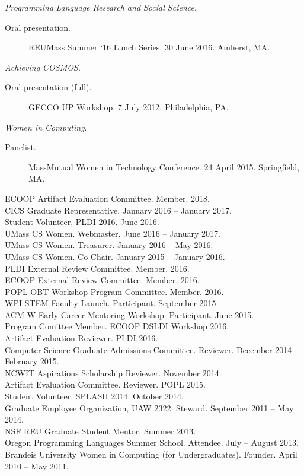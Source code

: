 \documentclass[10pt]{article}
\newcommand{\cvsec}[2]{
    \begin{tcolorbox}[width=\textwidth, breakable, title={#1}]
        #2
    \end{tcolorbox}
    \vspace{10pt}
}
\begin{document}
{    \emph{Programming Language Research and Social Science}.
    \begin{description}
      \item[Oral presentation.] REUMass Summer `16 Lunch Series. 30 June 2016.  Amherst, MA.
    \end{description}
    \vspace{10pt}
    \emph{Achieving COSMOS}.
    \begin{description}
    \item[Oral presentation (full).]  GECCO UP Workshop. 7 July 2012. Philadelphia, PA.
    \end{description}
    \vspace{10pt}
    \emph{Women in Computing}.
    \begin{description}
    \item[Panelist.]  MassMutual Women in Technology Conference. 24 April 2015. Springfield, MA.
    \end{description}
}


\cvsec{Professional Activities and Service}{
  ECOOP Artifact Evaluation Committee. Member. 2018.\\
  CICS Graduate Representative. January 2016 -- January 2017.\\
  Student Volunteer, PLDI 2016. June 2016. \\
  UMass CS Women. Webmaster. June 2016 -- January 2017.\\
  UMass CS Women. Treasurer. January 2016 -- May 2016.\\
  UMass CS Women. Co-Chair. January 2015 -- January 2016.\\
  PLDI External Review Committee.  Member.  2016.\\
  ECOOP External Review Committee.  Member.  2016.\\
  POPL OBT Workshop Program Committee.  Member.  2016.\\
  WPI STEM Faculty Launch.  Participant.  September 2015.\\
  ACM-W Early Career Mentoring Workshop.  Participant.  June 2015.\\
  Program Comittee Member. ECOOP DSLDI Workshop 2016. \\
  Artifact Evaluation Reviewer. PLDI 2016. \\
  Computer Science Graduate Admissions Committee. Reviewer. December 2014 -- February 2015.\\
  NCWIT Aspirations Scholarship Reviewer. November 2014. \\
  Artifact Evaluation Committee. Reviewer. POPL 2015.\\
  Student Volunteer, SPLASH 2014. October 2014.\\
  Graduate Employee Organization, UAW 2322. Steward. September 2011 -- May 2014.\\
  NSF REU Graduate Student Mentor. Summer 2013.\\
  Oregon Programming Languages Summer School. Attendee. July -- August 2013.	\\
  Brandeis University Women in Computing (for Undergraduates). Founder. April 2010 -- May 2011. 
}
\end{document}
